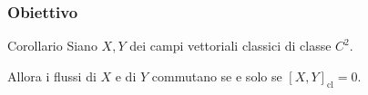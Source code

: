 \documentclass{beamer}
\newenvironment{definizioneb}{\begin{block}{Definizione}}{\end{block}}
\newenvironment{corollariob}{\begin{alertblock}{Corollario}}{\end{alertblock}}
\begin{document}
\begin{frame}
    \frametitle{Obiettivo}

    \begin{corollariob}
        Siano $ X,Y $ dei campi vettoriali classici di classe $ C^{2} $. 
    
        Allora i flussi di $ X $ e di $ Y $ commutano se e solo se $ [X,Y]_{\text{cl}}=0 $.
    \end{corollariob}

\end{frame}






\end{document}
